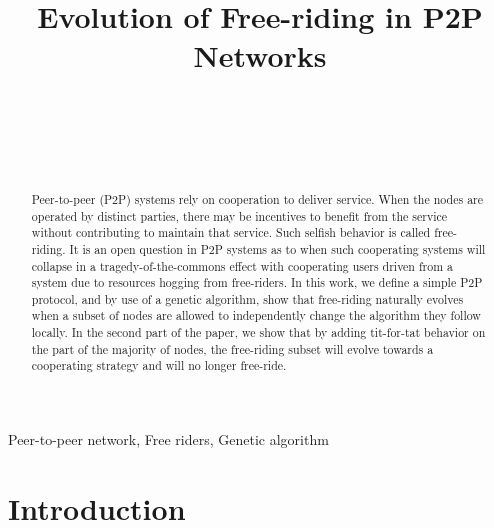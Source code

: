 \documentclass[12pt,journal,draftcls,letterpaper,onecolumn]{IEEEtran}
\begin{document}
\title{Evolution of Free-riding in P2P Networks}
\author{\\
\\
\and
{}\\
}
\maketitle

\begin{abstract}

Peer-to-peer (P2P) systems rely on cooperation to deliver service. When the
nodes are operated by distinct parties, there may be incentives to benefit 
from the service without contributing to maintain that service. 
Such selfish behavior is called free-riding. It is an open question in P2P systems 
as to when such cooperating systems will collapse in a tragedy-of-the-commons effect
with cooperating users driven from a system due to resources hogging from free-riders.
In this work, we define a simple P2P protocol, and by use of a genetic algorithm, 
show that free-riding naturally evolves when a subset of nodes are allowed to independently 
change the algorithm they follow locally. In the second part of the paper, we show that
by adding tit-for-tat behavior on the part of the majority of nodes, the free-riding subset
will evolve towards a cooperating strategy and will no longer free-ride.
\end{abstract}

\begin{IEEEkeywords}
Peer-to-peer network, Free riders, Genetic algorithm
\end{IEEEkeywords}

\IEEEpeerreviewmaketitle
\section{Introduction}\label{sec:introduction}
\end{document}
